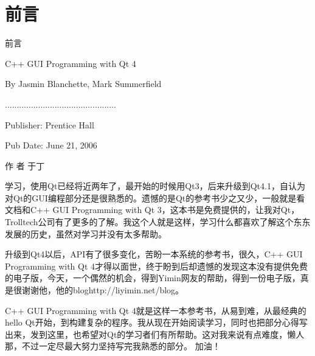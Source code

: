 \documentclass[11pt,oneside]{book}
\begin{document}
\frontmatter

\author{Jasmin Blanchette, Mark Summerfield }
\titleLA

\chapter*{前言}
前言
\begin{common-format}
C++ GUI Programming with Qt 4 

By Jasmin Blanchette, Mark Summerfield 

............................................... 

Publisher: Prentice Hall 

Pub Date: June 21, 2006 

作    者  于丁

学习，使用Qt已经将近两年了，最开始的时候用Qt3，后来升级到Qt4.1，自认为对Qt的GUI编程部分还是很熟悉的。遗憾的是Qt的参考书少之又少，一般就是看文档和C++ GUI Programming with Qt 3，这本书是免费提供的，让我对Qt，Trolltech公司有了更多的了解。我这个人就是这样，学习什么都喜欢了解这个东东发展的历史，虽然对学习并没有太多帮助。

升级到Qt4以后，API有了很多变化，苦盼一本系统的参考书，很久，C++ GUI Programming with Qt 4才得以面世，终于盼到后却遗憾的发现这本没有提供免费的电子版，今天，一个偶然的机会，得到Yimin网友的帮助，得到一份电子版，真是很谢谢他，他的bloghttp://liyimin.net/blog。

C++ GUI Programming with Qt 4就是这样一本参考书，从易到难，从最经典的hello Qt开始，到构建复杂的程序。我从现在开始阅读学习，同时也把部分心得写出来，发到这里，也希望对Qt的学习者们有所帮助。这对我来说有点难度，懒人那，不过一定尽最大努力坚持写完我熟悉的部分。
加油！


\end{common-format}


\setcounter{tocdepth}{2}
\tableofcontents
\end{document}
